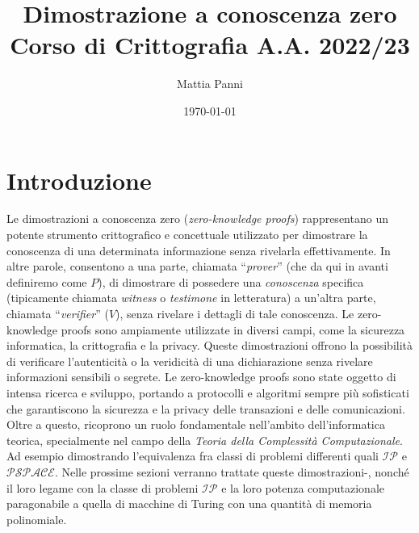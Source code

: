 \documentclass{article}
\title{Dimostrazione a conoscenza zero \\
        \large
        Corso di Crittografia A.A. 2022/23}
\author{Mattia Panni}
\date{\today}
\theoremstyle{definition}
\begin{document}
\maketitle
\clearpage
\tableofcontents
\clearpage

\section{Introduzione}
Le dimostrazioni a conoscenza zero (\emph{zero-knowledge proofs}) rappresentano un potente strumento crittografico e concettuale utilizzato per dimostrare la conoscenza di una determinata informazione senza rivelarla effettivamente. In altre parole, consentono a una parte, chiamata ``\emph{prover}'' (che da qui in avanti definiremo come $P$), di dimostrare di possedere una \emph{conoscenza} specifica (tipicamente chiamata \emph{witness} o \emph{testimone} in letteratura) a un'altra parte, chiamata ``\emph{verifier}'' ($V$), senza rivelare i dettagli di tale conoscenza. Le zero-knowledge proofs sono ampiamente utilizzate in diversi campi, come la sicurezza informatica, la crittografia e la privacy. Queste dimostrazioni offrono la possibilità di verificare l'autenticità o la veridicità di una dichiarazione senza rivelare informazioni sensibili o segrete. Le zero-knowledge proofs sono state oggetto di intensa ricerca e sviluppo, portando a protocolli e algoritmi sempre più sofisticati che garantiscono la sicurezza e la privacy delle transazioni e delle comunicazioni. Oltre a questo, ricoprono un ruolo fondamentale nell'ambito dell'informatica teorica, specialmente nel campo della \emph{Teoria della Complessità Computazionale}. Ad esempio dimostrando l'equivalenza fra classi di problemi differenti quali \texttt{$\mathcal{IP}$} e \texttt{$\mathcal{PSPACE}$}. Nelle prossime sezioni verranno trattate queste dimostrazioni-, nonché il loro legame con la classe di problemi \texttt{$\mathcal{IP}$} e la loro potenza computazionale paragonabile a quella di macchine di Turing con una quantità di memoria polinomiale.
\end{document}
